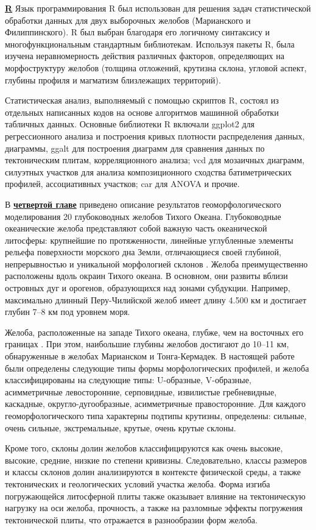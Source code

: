 \underline{\textbf{R}} 
Язык программирования R \cite{RCoreTeam2014} был использован для решения задач статистической обработки данных для двух выборочных желобов (Марианского и Филиппинского). R был выбран благодаря его логичному синтаксису и многофункциональным стандартным библиотекам. Используя пакеты R, была изучена неравномерность действия различных факторов, определяющих на морфоструктуру желобов (толщина отложений, крутизна склона, угловой аспект, глубины профиля и магматизм близлежащих территорий).

Статистическая анализ, выполняемый с помощью скриптов R, состоял из отдельных написанных кодов на основе алгоритмов машинной обработки табличных данных. Основные библиотеки R включали {ggplot2} для регрессионного анализа и построения кривых плотности распределения данных, диаграммы, {ggalt} для построения диаграмм для сравнения данных по тектоническим плитам, корреляционного анализа; {vcd} для мозаичных диаграмм, силуэтных участков для анализа композиционного сходства батиметрических профилей, ассоциативных участков; {car} для ANOVA и прочие. 


В \underline{\textbf{четвертой главе}} приведено описание результатов геоморфологического моделирования 20 глубоководных желобов Тихого Океана. Глубоководные океанические желоба представляют собой важную часть океанической литосферы: крупнейшие по протяженности, линейные углубленные элементы рельефа поверхности морского дна Земли, отличающиеся своей глубиной, непрерывностью и уникальной морфологией склонов \cite{Быков1985}. Желоба преимущественно расположены вдоль окраин Тихого океана. В основном, они развиты вблизи островных дуг и орогенов, образующихся над зонами субдукции. Например, максимально длинный Перу-Чилийской желоб имеет длину 4.500 км и достигает глубин 7–8 км под уровнем моря. 

Желоба, расположенные на западе Тихого океана, глубже, чем на восточных его границах \cite{Агапова1973}. При этом, наибольшие глубины желобов достигают до 10–11 км, обнаруженные в желобах Марианском и Тонга-Кермадек. В настоящей работе были определены следующие типы формы морфологических профилей, и желоба классифицированы на следующие типы: U-образные, V-образные, асимметричные левосторонние, серповидные, извилистые гребневидные, каскадные, округло-дугообразные, асимметричные правосторонние. Для каждого геоморфологического типа характерны подтипы крутизны, определены: сильные, очень сильные, экстремальные, крутые, очень крутые склоны. 

Кроме того, склоны долин желобов классифицируются как очень высокие, высокие, средние, низкие по степени кривизны. Следовательно, классы размеров и классы склонов долин анализируются в контексте физической среды, а также тектонических и геологических условий участка желоба. Форма изгиба погружающейся литосферной плиты также оказывает влияние на тектоническую нагрузку на оси желоба, прочность, а также на разломные эффекты погружения тектонической плиты, что отражается в разнообразии форм желоба. 

